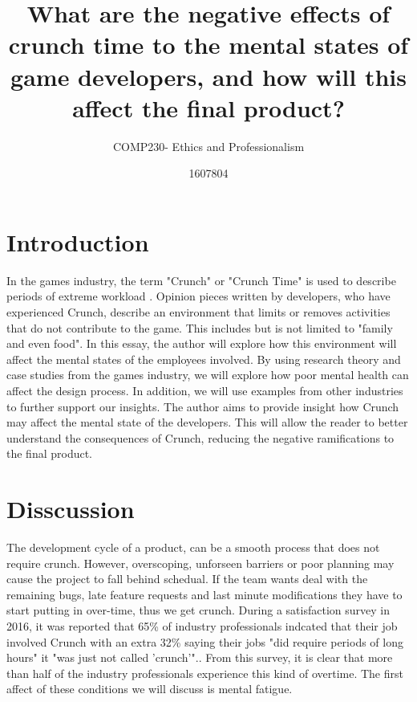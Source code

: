 \documentclass{scrartcl}
\title{What are the negative effects of crunch time to the mental states of game developers, and how will this affect the final product? }
\subtitle{COMP230- Ethics and Professionalism}
\author{1607804}
\begin{document}
\maketitle


\section{Introduction}
In the games industry, the term "Crunch" or "Crunch Time" is used to describe periods of extreme workload \cite[p. 468]{edholm2017crunch}. Opinion pieces written by developers, who have experienced Crunch, describe an environment that limits or removes activities that do not contribute to the game. This includes but is not limited to "family and even food"\cite{schreier_2017}. In this essay, the author will explore how this environment will affect the mental states of the employees involved. By using research theory and case studies from the games industry, we will explore how poor mental health can affect the design process. In addition, we will use examples from other industries to further support our insights. The author aims to provide insight how Crunch may affect the mental state of the developers. This will allow the reader to better understand the consequences of Crunch, reducing the negative ramifications to the final product.

\section{Disscussion}
The development cycle of a product, can be a smooth process that does not require crunch. However,  overscoping, unforseen barriers or poor planning may cause the project to fall behind schedual. If the team wants deal with the remaining bugs, late feature requests and last minute modifications they have to start putting in over-time, thus we get crunch\cite{onlineWebl}\cite{edholm2017crunch}. During a satisfaction survey in 2016, it was reported that 65\%  of industry professionals indcated that their job involved Crunch with an extra 32\%  saying their jobs "did require periods of long hours" it "was just not called 'crunch'".\cite[p.20]{weststarlegault2016}. From this survey, it is clear that more than half of the industry professionals experience this kind of overtime. The first affect of these conditions we will discuss is mental fatigue.
\end{document}
